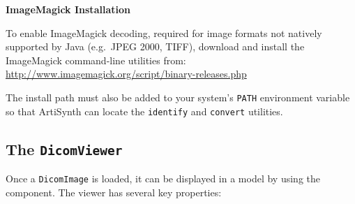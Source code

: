 \begin{sideblock}
\textbf{ImageMagick Installation}

To enable ImageMagick decoding, required for image formats not natively supported
by Java (e.g.~JPEG 2000, TIFF), download and install the ImageMagick command-line utilities 
from: \url{http://www.imagemagick.org/script/binary-releases.php}

The install path must also be added to your system's \texttt{PATH} environment variable
so that ArtiSynth can locate the \texttt{identify} and \texttt{convert} utilities.
\end{sideblock}

\subsection{The \texttt{DicomViewer}}

Once a \lstinline{DicomImage} is loaded, it can be displayed in a model by using the
 component.  The viewer
has several key properties:

